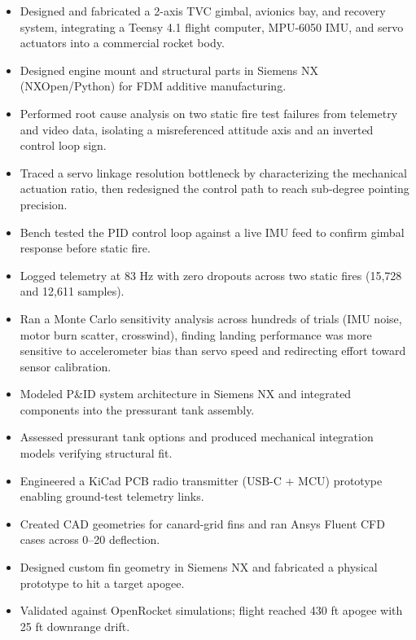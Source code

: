 \begin{itemize}
  \item Designed and fabricated a 2-axis TVC gimbal, avionics bay, and recovery system, integrating a Teensy 4.1 flight computer, MPU-6050 IMU, and servo actuators into a commercial rocket body.
  \item Designed engine mount and structural parts in Siemens NX (NXOpen/Python) for FDM additive manufacturing.
  \item Performed root cause analysis on two static fire test failures from telemetry and video data, isolating a misreferenced attitude axis and an inverted control loop sign.
  \item Traced a servo linkage resolution bottleneck by characterizing the mechanical actuation ratio, then redesigned the control path to reach sub-degree pointing precision.
  \item Bench tested the PID control loop against a live IMU feed to confirm gimbal response before static fire.
  \item Logged telemetry at 83 Hz with zero dropouts across two static fires (15,728 and 12,611 samples).
  \item Ran a Monte Carlo sensitivity analysis across hundreds of trials (IMU noise, motor burn scatter, crosswind), finding landing performance was more sensitive to accelerometer bias than servo speed and redirecting effort toward sensor calibration.
\end{itemize}
\entrygap

\begin{itemize}
  \item Modeled P\&ID system architecture in Siemens NX and integrated components into the pressurant tank assembly.
  \item Assessed pressurant tank options and produced mechanical integration models verifying structural fit.
  \item Engineered a KiCad PCB radio transmitter (USB-C + MCU) prototype enabling ground-test telemetry links.
  \item Created CAD geometries for canard-grid fins and ran Ansys Fluent CFD cases across 0--20\textdegree{} deflection.
\end{itemize}
\entrygap

\begin{itemize}
  \item Designed custom fin geometry in Siemens NX and fabricated a physical prototype to hit a target apogee.
  \item Validated against OpenRocket simulations; flight reached 430 ft apogee with 25 ft downrange drift.
\end{itemize}
\entrygap

